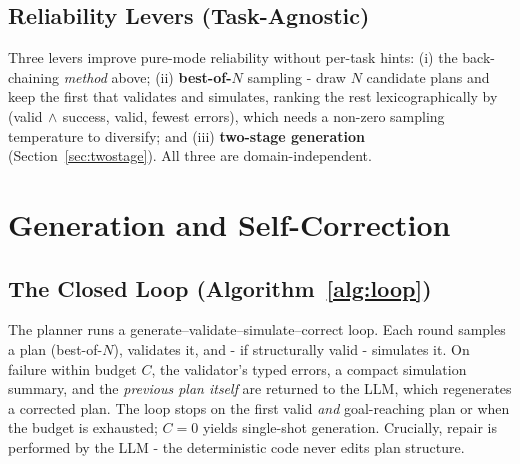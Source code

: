 \documentclass[journal]{IEEEtran}
\begin{document}
\subsection{Reliability Levers (Task-Agnostic)}
Three levers improve pure-mode reliability without per-task hints: (i) the back-chaining \emph{method} above; (ii) \textbf{best-of-$N$} sampling - draw $N$ candidate plans and keep the first that validates and simulates, ranking the rest lexicographically by (valid$\,\wedge\,$success, valid, fewest errors), which needs a non-zero sampling temperature to diversify; and (iii) \textbf{two-stage generation} (Section~\ref{sec:twostage}). All three are domain-independent.

\section{Generation and Self-Correction}

\subsection{The Closed Loop (Algorithm~\ref{alg:loop})}
The planner runs a generate--validate--simulate--correct loop. Each round samples a plan (best-of-$N$), validates it, and - if structurally valid - simulates it. On failure within budget $C$, the validator's typed errors, a compact simulation summary, and the \emph{previous plan itself} are returned to the LLM, which regenerates a corrected plan. The loop stops on the first valid \emph{and} goal-reaching plan or when the budget is exhausted; $C=0$ yields single-shot generation. Crucially, repair is performed by the LLM - the deterministic code never edits plan structure.
\end{document}
